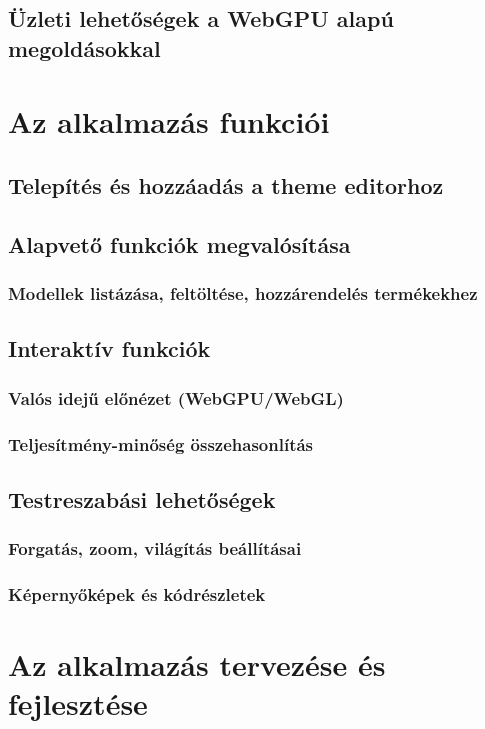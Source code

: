 \documentclass[12pt]{report}
\begin{document}
        \section{Üzleti lehetőségek a WebGPU alapú megoldásokkal}
        
        \chapter{Az alkalmazás funkciói}
        \section{Telepítés és hozzáadás a theme editorhoz}
        \section{Alapvető funkciók megvalósítása}
        \subsection{Modellek listázása, feltöltése, hozzárendelés termékekhez}
        \section{Interaktív funkciók}
        \subsection{Valós idejű előnézet (WebGPU/WebGL)}
        \subsection{Teljesítmény-minőség összehasonlítás}
        \section{Testreszabási lehetőségek}
        \subsection{Forgatás, zoom, világítás beállításai}
        \subsection{Képernyőképek és kódrészletek}

        \chapter{Az alkalmazás tervezése és fejlesztése}
\end{document}
